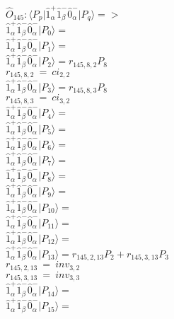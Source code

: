 \documentclass[14pt]{article}
\begin{document}
    $\hat{O}_{145}:  \langle{P_p}\vert \hat{1}_{\alpha}^{+}\hat{1}_{\beta}^{-}\hat{0}_{\alpha}^{-} \vert{P_q}\rangle => $ \\ 
    $ \hat{1}_{\alpha}^{+}\hat{1}_{\beta}^{-}\hat{0}_{\alpha}^{-} \vert{P_{0}}\rangle =  $ \\ 
    $ \hat{1}_{\alpha}^{+}\hat{1}_{\beta}^{-}\hat{0}_{\alpha}^{-} \vert{P_{1}}\rangle =  $ \\ 
    $ \hat{1}_{\alpha}^{+}\hat{1}_{\beta}^{-}\hat{0}_{\alpha}^{-} \vert{P_{2}}\rangle = {r}_{145,8,2}P_{8} $ \\ 
    ${r}_{145,8,2}\ =\ {ci}_{2,2} $ \\ 
    $ \hat{1}_{\alpha}^{+}\hat{1}_{\beta}^{-}\hat{0}_{\alpha}^{-} \vert{P_{3}}\rangle = {r}_{145,8,3}P_{8} $ \\ 
    ${r}_{145,8,3}\ =\ {ci}_{3,2} $ \\ 
    $ \hat{1}_{\alpha}^{+}\hat{1}_{\beta}^{-}\hat{0}_{\alpha}^{-} \vert{P_{4}}\rangle =  $ \\ 
    $ \hat{1}_{\alpha}^{+}\hat{1}_{\beta}^{-}\hat{0}_{\alpha}^{-} \vert{P_{5}}\rangle =  $ \\ 
    $ \hat{1}_{\alpha}^{+}\hat{1}_{\beta}^{-}\hat{0}_{\alpha}^{-} \vert{P_{6}}\rangle =  $ \\ 
    $ \hat{1}_{\alpha}^{+}\hat{1}_{\beta}^{-}\hat{0}_{\alpha}^{-} \vert{P_{7}}\rangle =  $ \\ 
    $ \hat{1}_{\alpha}^{+}\hat{1}_{\beta}^{-}\hat{0}_{\alpha}^{-} \vert{P_{8}}\rangle =  $ \\ 
    $ \hat{1}_{\alpha}^{+}\hat{1}_{\beta}^{-}\hat{0}_{\alpha}^{-} \vert{P_{9}}\rangle =  $ \\ 
    $ \hat{1}_{\alpha}^{+}\hat{1}_{\beta}^{-}\hat{0}_{\alpha}^{-} \vert{P_{10}}\rangle =  $ \\ 
    $ \hat{1}_{\alpha}^{+}\hat{1}_{\beta}^{-}\hat{0}_{\alpha}^{-} \vert{P_{11}}\rangle =  $ \\ 
    $ \hat{1}_{\alpha}^{+}\hat{1}_{\beta}^{-}\hat{0}_{\alpha}^{-} \vert{P_{12}}\rangle =  $ \\ 
    $ \hat{1}_{\alpha}^{+}\hat{1}_{\beta}^{-}\hat{0}_{\alpha}^{-} \vert{P_{13}}\rangle = {r}_{145,2,13}P_{2}+{r}_{145,3,13}P_{3} $ \\ 
    ${r}_{145,2,13}\ =\ {inv}_{3,2} $ \\ 
    ${r}_{145,3,13}\ =\ {inv}_{3,3} $ \\ 
    $ \hat{1}_{\alpha}^{+}\hat{1}_{\beta}^{-}\hat{0}_{\alpha}^{-} \vert{P_{14}}\rangle =  $ \\ 
    $ \hat{1}_{\alpha}^{+}\hat{1}_{\beta}^{-}\hat{0}_{\alpha}^{-} \vert{P_{15}}\rangle =  $ \\ 
    
\end{document}
